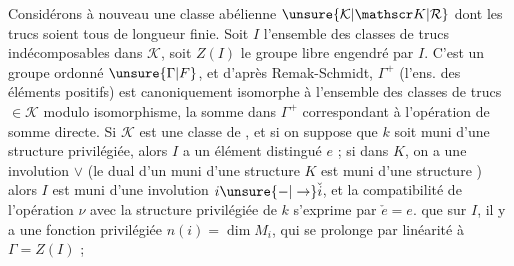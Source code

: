 Considérons à nouveau une classe abélienne 
$\unsure{\mathcal K|\mathscr K|\mathcal R}$ dont les trucs soient tous de longueur finie.
Soit $I$ l'ensemble des classes de trucs indécomposables dans $\mathcal K$, soit $Z(I)$ le groupe libre
engendré par $I$. C'est un groupe ordonné $\unsure{\Gamma|F}$, et
d'après Remak-Schmidt, $\Gamma^+$ (l'ens. des
éléments positifs) est canoniquement isomorphe à l'ensemble des classes de trucs
$\in\mathcal K$ modulo isomorphisme, la somme dans
$\Gamma^+$ correspondant à l'opération de somme
directe. Si $\mathcal K$ est une classe de , 
et si on suppose que $k$ soit muni d'une
structure  privilégiée, alors $I$ a un
élément distingué $e$ ; si dans $K$, on a
une involution $\vee$ (le dual d'un 
muni d'une structure $K$ est muni
d'une structure ) alors $I$ est muni
d'une involution $i\unsure{-|\to}\check i$, et la
compatibilité de l'opération $\nu$ avec la structure
privilégiée de $k$ s'exprime par $\check e=e$.
 que sur $I$, il y a une fonction
privilégiée $n(i)=\dim M_i$, qui se
prolonge par linéarité à $\Gamma=Z(I)$ ;
